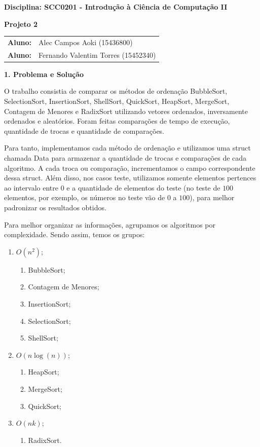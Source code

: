 \documentclass[10pt]{article}
\begin{document}
\begin{center}
    \large\textbf{Disciplina: SCC0201 - Introdução à Ciência de Computação II}
    
    \large\textbf{Projeto 2}
\end{center}

\begin{tabular}{@{}ll@{}}
\textbf{Aluno:} & Alec Campos Aoki (15436800)\\
\textbf{Aluno:} & Fernando Valentim Torres (15452340)
\end{tabular}

\vspace{0.5cm}

\textbf{1. Problema e Solução}

O trabalho consistia de comparar os métodos de ordenação BubbleSort, SelectionSort, InsertionSort, ShellSort, QuickSort, HeapSort, MergeSort, Contagem de Menores e RadixSort utilizando vetores ordenados, inversamente ordenados e aleatórios. Foram feitas comparações de tempo de execução, quantidade de trocas e quantidade de comparações.

Para tanto, implementamos cada método de ordenação e utilizamos uma struct chamada Data para armazenar a quantidade de trocas e comparações de cada algoritmo. A cada troca ou comparação, incrementamos o campo correspondente dessa struct. Além disso, nos casos teste, utilizamos somente elementos pertences ao intervalo entre 0 e a quantidade de elementos do teste (no teste de $100$ elementos, por exemplo, os números no teste vão de $0$ a $100$), para melhor padronizar os resultados obtidos.

Para melhor organizar as informações, agrupamos os algoritmos por complexidade. Sendo assim, temos os grupos:

\begin{enumerate}
  \item $O(n^2)$;
  \begin{enumerate}
    \item BubbleSort;
    \item Contagem de Menores;
    \item InsertionSort;
    \item SelectionSort;
    \item ShellSort;
  \end{enumerate}
  \item $O(n \log(n))$;
  \begin{enumerate}
    \item HeapSort;
    \item MergeSort;
    \item QuickSort;
  \end{enumerate}
  \item $O(n k)$;
  \begin{enumerate}
    \item RadixSort.
  \end{enumerate}
\end{enumerate}
\end{document}

